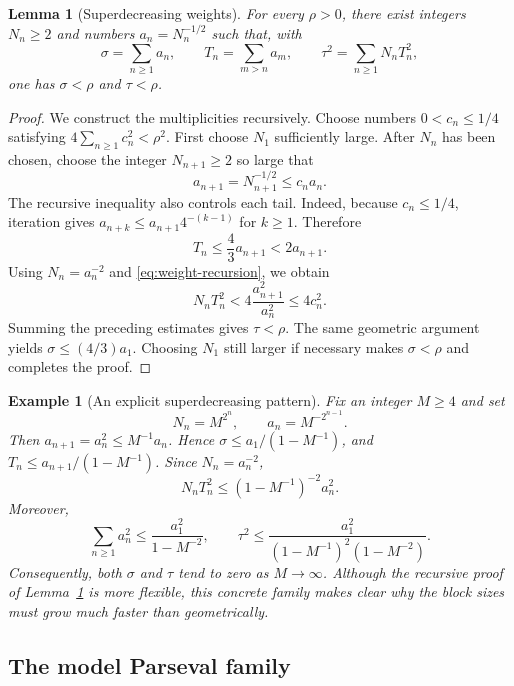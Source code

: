 \documentclass[10pt,a4paper]{amsart}
\numberwithin{equation}{section}
\newtheorem{lemma}[theorem]{Lemma}
\newtheorem{example}[theorem]{Example}
\begin{document}
\begin{lemma}[Superdecreasing weights]\label{lem:weights}
For every $\rho>0$, there exist integers $N_n\geq2$ and numbers
$a_n=N_n^{-1/2}$ such that, with
\begin{equation}\label{eq:weight-quantities}
 \sigma=\sum_{n\geq1}a_n,
 \qquad T_n=\sum_{m>n}a_m,
 \qquad \tau^2=\sum_{n\geq1}N_nT_n^2,
\end{equation}
one has $\sigma<\rho$ and $\tau<\rho$.
\end{lemma}

\begin{proof}
We construct the multiplicities recursively.  Choose numbers
$0<c_n\leq1/4$ satisfying
$4\sum_{n\geq1}c_n^2<\rho^2$.  First choose $N_1$ sufficiently large.
After $N_n$ has been chosen, choose the integer $N_{n+1}\geq2$ so large that
\begin{equation}\label{eq:weight-recursion}
 a_{n+1}=N_{n+1}^{-1/2}\leq c_na_n.
\end{equation}
The recursive inequality also controls each tail.  Indeed, because
$c_n\leq1/4$, iteration gives
$a_{n+k}\leq a_{n+1}4^{-(k-1)}$ for $k\geq1$.  Therefore
\begin{equation}\label{eq:tail-bound}
 T_n\leq \frac43a_{n+1}<2a_{n+1}.
\end{equation}
Using $N_n=a_n^{-2}$ and \eqref{eq:weight-recursion}, we obtain
\[
 N_nT_n^2
 <4\frac{a_{n+1}^2}{a_n^2}
 \leq4c_n^2.
\]
Summing the preceding estimates gives $\tau<\rho$.  The same geometric
argument yields $\sigma\leq(4/3)a_1$.  Choosing $N_1$ still larger if
necessary makes $\sigma<\rho$ and completes the proof.
\end{proof}

\begin{example}[An explicit superdecreasing pattern]\label{ex:explicit-weights}
Fix an integer $M\geq4$ and set
\[
 N_n=M^{2^n},\qquad a_n=M^{-2^{n-1}}.
\]
Then $a_{n+1}=a_n^2\leq M^{-1}a_n$.  Hence
$\sigma\leq a_1/(1-M^{-1})$, and
$T_n\leq a_{n+1}/(1-M^{-1})$.  Since $N_n=a_n^{-2}$,
\[
 N_nT_n^2
 \leq (1-M^{-1})^{-2}a_n^2.
\]
Moreover,
\[
 \sum_{n\geq1}a_n^2
 \leq \frac{a_1^2}{1-M^{-2}},
 \qquad
 \tau^2\leq
 \frac{a_1^2}{(1-M^{-1})^2(1-M^{-2})}.
\]
Consequently, both $\sigma$ and $\tau$ tend to zero as $M\to\infty$.  Although
the recursive proof of Lemma~\ref{lem:weights} is more flexible, this concrete
family makes clear why the block sizes must grow much faster than
geometrically.
\end{example}

\subsection{The model Parseval family}
\end{document}
